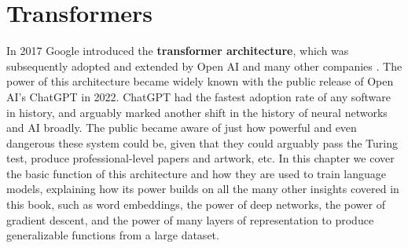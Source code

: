 \chapter{Transformers}\label{ch_transformers}


In 2017 Google introduced the \textbf{transformer architecture}, which was subsequently adopted and extended by Open AI and many other companies \cite{vaswani2017attention}. The power of this architecture became widely known with the public release of Open AI's ChatGPT in 2022. ChatGPT had the fastest adoption rate of any software in history, and arguably marked another shift in the history of neural networks and AI broadly. The public became aware of just how powerful and even dangerous these system could be, given that they could arguably pass the Turing test, produce professional-level papers and artwork, etc. In this chapter we cover the basic function of this architecture and how they are used to train language models, explaining how its power builds on all the many other insights covered in this book, such as word embeddings, the power of deep networks, the power of gradient descent, and the power of many layers of representation to produce generalizable functions from a  large dataset.

